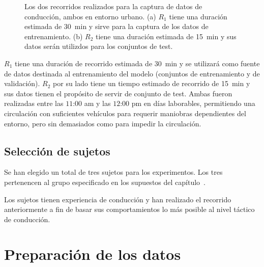 \begin{figure}
	\centering
	\qquad
	\caption[Los dos recorridos planteados para la captura de datos de conducción]{Los dos recorridos realizados para la captura de datos de conducción, ambos en entorno urbano. (a) $R_1$ tiene una duración estimada de \SI{30}{\minute} y sirve para la captura de los datos de entrenamiento. (b) $R_2$ tiene una duración estimada de \SI{15}{\minute} y sus datos serán utilizdos para los conjuntos de test.}
	\label{fig:proposed-routes}
\end{figure}

$R_1$ tiene una duración de recorrido estimada de \SI{30}{\minute} y se utilizará como fuente de datos destinada al entrenamiento del modelo (conjuntos de entrenamiento y de validación). $R_2$ por su lado tiene un tiempo estimado de recorrido de \SI{15}{\minute} y sus datos tienen el propósito de servir de conjunto de test. Ambas fueron realizadas entre las $11$:$00$ am y las $12$:$00$ pm en días laborables, permitiendo una circulación con suficientes vehículos para requerir maniobras dependientes del entorno, pero sin demasiados como para impedir la circulación.

\subsection{Selección de sujetos}

Se han elegido un total de tres sujetos para los experimentos. Los tres pertenencen al grupo especificado en los supuestos del capítulo~.

Los sujetos tienen experiencia de conducción y han realizado el recorrido anteriormente a fin de basar sus comportamientos lo más posible al nivel táctico de conducción.

\section{Preparación de los datos}

